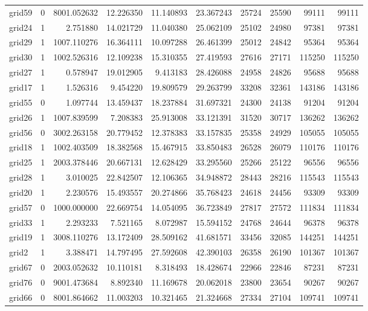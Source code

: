 \begin{longtable}{|l|r|r|r|r|r|r|r|r|r|}
grid59 & 0 & 8001.052632 & 12.226350 & 11.140893 & 23.367243 & 25724 & 25590 & 99111 & 99111 \\
grid24 & 1 & 2.751880 & 14.021729 & 11.040380 & 25.062109 & 25102 & 24980 & 97381 & 97381 \\
grid29 & 1 & 1007.110276 & 16.364111 & 10.097288 & 26.461399 & 25012 & 24842 & 95364 & 95364 \\
grid30 & 1 & 1002.526316 & 12.109238 & 15.310355 & 27.419593 & 27616 & 27171 & 115250 & 115250 \\
grid27 & 1 & 0.578947 & 19.012905 & 9.413183 & 28.426088 & 24958 & 24826 & 95688 & 95688 \\
grid17 & 1 & 1.526316 & 9.454220 & 19.809579 & 29.263799 & 33208 & 32361 & 143186 & 143186 \\
grid55 & 0 & 1.097744 & 13.459437 & 18.237884 & 31.697321 & 24300 & 24138 & 91204 & 91204 \\
grid26 & 1 & 1007.839599 & 7.208383 & 25.913008 & 33.121391 & 31520 & 30717 & 136262 & 136262 \\
grid56 & 0 & 3002.263158 & 20.779452 & 12.378383 & 33.157835 & 25358 & 24929 & 105055 & 105055 \\
grid18 & 1 & 1002.403509 & 18.382568 & 15.467915 & 33.850483 & 26528 & 26079 & 110176 & 110176 \\
grid25 & 1 & 2003.378446 & 20.667131 & 12.628429 & 33.295560 & 25266 & 25122 & 96556 & 96556 \\
grid28 & 1 & 3.010025 & 22.842507 & 12.106365 & 34.948872 & 28443 & 28216 & 115543 & 115543 \\
grid20 & 1 & 2.230576 & 15.493557 & 20.274866 & 35.768423 & 24618 & 24456 & 93309 & 93309 \\
grid57 & 0 & 1000.000000 & 22.669754 & 14.054095 & 36.723849 & 27817 & 27572 & 111834 & 111834 \\
grid33 & 1 & 2.293233 & 7.521165 & 8.072987 & 15.594152 & 24768 & 24644 & 96378 & 96378 \\
grid19 & 1 & 3008.110276 & 13.172409 & 28.509162 & 41.681571 & 33456 & 32085 & 144251 & 144251 \\
grid2 & 1 & 3.388471 & 14.797495 & 27.592608 & 42.390103 & 26358 & 26190 & 101367 & 101367 \\
grid67 & 0 & 2003.052632 & 10.110181 & 8.318493 & 18.428674 & 22966 & 22846 & 87231 & 87231 \\
grid76 & 0 & 9001.473684 & 8.892340 & 11.169678 & 20.062018 & 23800 & 23654 & 90267 & 90267 \\
grid66 & 0 & 8001.864662 & 11.003203 & 10.321465 & 21.324668 & 27334 & 27104 & 109741 & 109741 \\

\end{longtable}
